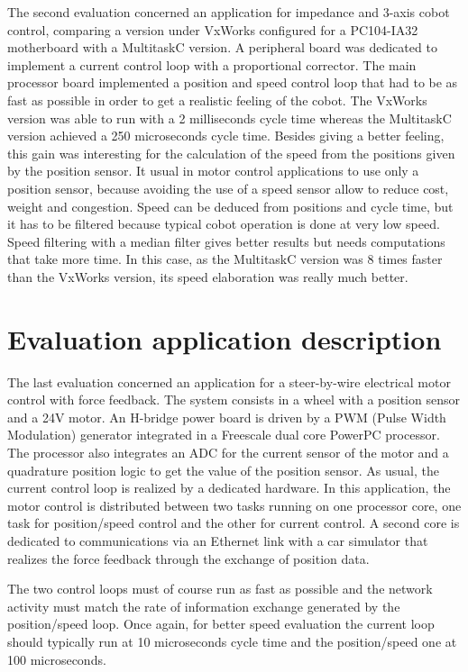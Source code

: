 \documentclass[10pt]{report}
\begin{document}
The second evaluation concerned an application for impedance and 3-axis cobot control, comparing a version under VxWorks configured 
for a PC104-IA32 motherboard with a MultitaskC version. A peripheral board was dedicated to implement a current control loop with a
proportional corrector. The main processor board implemented a position and speed control loop that had to be as fast as possible 
in order to get a realistic feeling of the cobot. The VxWorks version was able to run with a 2 milliseconds cycle time 
whereas the MultitaskC version achieved a 250 microseconds cycle time. Besides giving a better feeling, this gain was interesting 
for the calculation of the speed from the positions given by the position sensor. It usual in motor control applications to use only 
a position sensor, because avoiding the use of a speed sensor allow to reduce cost, weight and congestion. Speed can be deduced from 
positions and cycle time, but it has to be filtered because typical cobot operation is done at very low speed. Speed filtering with 
a median filter gives better results but needs computations that take more time. In this case, as the MultitaskC version was
8 times faster than the VxWorks version, its speed elaboration was really much better.

\section{Evaluation application description}

The last evaluation concerned an application for a steer-by-wire electrical motor control with force feedback.
The system consists in a wheel with a position sensor and a 24V motor. An H-bridge power board is driven
by a PWM (Pulse Width Modulation) generator integrated in a Freescale dual core PowerPC processor. The
processor also integrates an ADC for the current sensor of the motor and a quadrature position logic to get the 
value of the position sensor. As usual, the current control loop is realized by a dedicated hardware.
In this application, the motor control is distributed between two tasks running on one processor core, one task 
for position/speed control and the other for current control. A second core is dedicated to communications via an Ethernet
link with a car simulator that realizes the force feedback through the exchange of position data.

The two control loops must of course run as fast as possible and the network activity must match the rate 
of information exchange generated by the position/speed loop. Once again, for better speed evaluation the current loop should 
typically run at 10 microseconds cycle time and the position/speed one at 100 microseconds.
\end{document}
